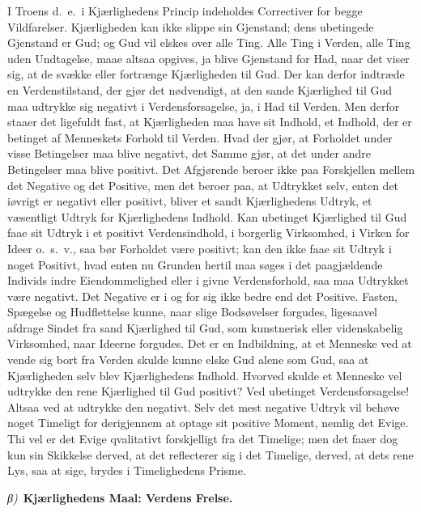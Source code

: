\documentclass[12pt]{book}
\newcommand{\greekrun}[2]{%
  \medskip\begin{center}{\itshape #1)}\ {\bfseries #2}\end{center}\medskip}
\begin{document}
I Troens d.\ e.\ i Kjærlighedens Princip indeholdes Correctiver for
begge Vildfarelser. Kjærligheden kan ikke slippe sin Gjenstand; dens
ubetingede Gjenstand er Gud; og Gud vil elskes over alle Ting. Alle
Ting i Verden, alle Ting uden Undtagelse, maae altsaa opgives, ja
blive Gjenstand for Had, naar det viser sig, at de svække eller
fortrænge Kjærligheden til Gud. Der kan derfor indtræde en
Verdenstilstand, der gjør det nødvendigt, at den sande Kjærlighed
til Gud maa udtrykke sig negativt i Verdensforsagelse, ja, i Had til
Verden. Men derfor staaer det ligefuldt fast, at Kjærligheden maa
have sit Indhold, et Indhold, der er betinget af Menneskets Forhold
til Verden. Hvad der gjør, at Forholdet under visse Betingelser maa
blive negativt, det Samme gjør, at
det under andre Betingelser maa blive positivt. Det Afgjørende
beroer ikke paa Forskjellen mellem det Negative og det Positive, men
det beroer paa, at Udtrykket selv, enten det iøvrigt er negativt
eller positivt, bliver et sandt Kjærlighedens Udtryk, et væsentligt
Udtryk for Kjærlighedens Indhold. Kan ubetinget Kjærlighed til Gud
faae sit Udtryk i et positivt Verdensindhold, i borgerlig
Virksomhed, i Virken for Ideer o.\ s.\ v., saa bør Forholdet være
positivt; kan den ikke faae sit Udtryk i noget Positivt, hvad enten
nu Grunden hertil maa søges i det paagjældende Individs indre
Eiendommelighed eller i givne Verdensforhold, saa maa Udtrykket være
negativt. Det Negative er i og for sig ikke bedre end det Positive.
Fasten, Spægelse og Hudflettelse kunne, naar slige Bodsøvelser
forgudes, ligesaavel afdrage Sindet fra sand Kjærlighed til Gud, som
kunstnerisk eller videnskabelig Virksomhed, naar Ideerne forgudes.
Det er en Indbildning, at et Menneske ved at vende sig bort fra
Verden skulde kunne elske Gud alene som Gud, saa at Kjærligheden
selv blev Kjærlighedens Indhold. Hvorved skulde et Menneske vel
udtrykke den rene Kjærlighed til Gud positivt? Ved ubetinget
Verdensforsagelse! Altsaa ved at udtrykke den negativt. Selv det
mest negative Udtryk vil behøve noget Timeligt for derigjennem at
optage sit positive Moment, nemlig det Evige. Thi vel er det Evige
qvalitativt forskjelligt fra det Timelige; men det faaer dog kun sin
Skikkelse derved, at det reflecterer sig i det Timelige, derved, at
dets rene Lys, saa at sige, brydes i Timelighedens Prisme.

\greekrun{β}{Kjærlighedens Maal: Verdens Frelse.}
\end{document}

